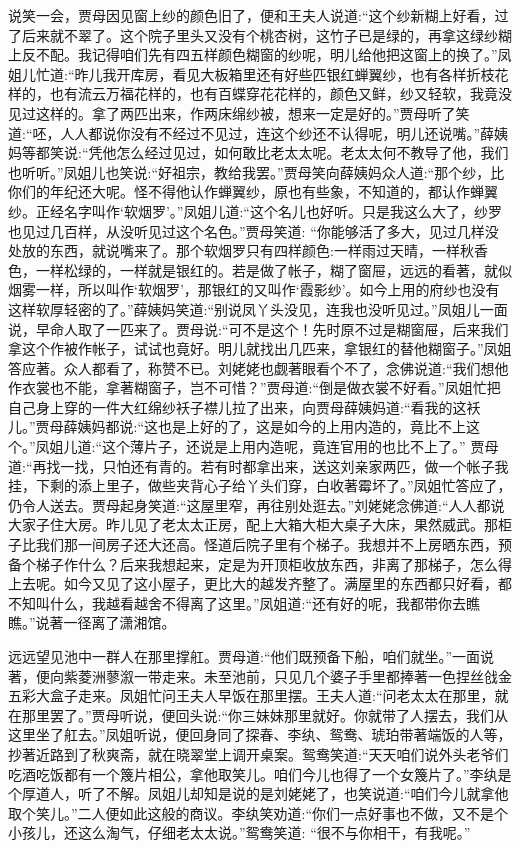 \begin{parag}
    说笑一会，贾母因见窗上纱的颜色旧了，便和王夫人说道:“这个纱新糊上好看，过了后来就不翠了。这个院子里头又没有个桃杏树，这竹子已是绿的，再拿这绿纱糊上反不配。我记得咱们先有四五样颜色糊窗的纱呢，明儿给他把这窗上的换了。”凤姐儿忙道:“昨儿我开库房，看见大板箱里还有好些匹银红蝉翼纱，也有各样折枝花样的，也有流云万福花样的，也有百蝶穿花花样的，颜色又鲜，纱又轻软，我竟没见过这样的。拿了两匹出来，作两床绵纱被，想来一定是好的。”贾母听了笑道:“呸，人人都说你没有不经过不见过，连这个纱还不认得呢，明儿还说嘴。”薛姨妈等都笑说:“凭他怎么经过见过，如何敢比老太太呢。老太太何不教导了他，我们也听听。”凤姐儿也笑说:“好祖宗，教给我罢。”贾母笑向薛姨妈众人道:“那个纱，比你们的年纪还大呢。怪不得他认作蝉翼纱，原也有些象，不知道的，都认作蝉翼纱。正经名字叫作‘软烟罗’。”凤姐儿道:“这个名儿也好听。只是我这么大了，纱罗也见过几百样，从没听见过这个名色。”贾母笑道: “你能够活了多大，见过几样没处放的东西，就说嘴来了。那个软烟罗只有四样颜色:一样雨过天晴，一样秋香色，一样松绿的，一样就是银红的。若是做了帐子，糊了窗屉，远远的看著，就似烟雾一样，所以叫作‘软烟罗’，那银红的又叫作‘霞影纱’。如今上用的府纱也没有这样软厚轻密的了。”薛姨妈笑道:“别说凤丫头没见，连我也没听见过。”凤姐儿一面说，早命人取了一匹来了。贾母说:“可不是这个！先时原不过是糊窗屉，后来我们拿这个作被作帐子，试试也竟好。明儿就找出几匹来，拿银红的替他糊窗子。”凤姐答应著。众人都看了，称赞不已。刘姥姥也觑著眼看个不了，念佛说道:“我们想他作衣裳也不能，拿著糊窗子，岂不可惜？”贾母道:“倒是做衣裳不好看。”凤姐忙把自己身上穿的一件大红绵纱袄子襟儿拉了出来，向贾母薛姨妈道:“看我的这袄儿。”贾母薛姨妈都说:“这也是上好的了，这是如今的上用内造的，竟比不上这个。”凤姐儿道:“这个薄片子，还说是上用内造呢，竟连官用的也比不上了。” 贾母道:“再找一找，只怕还有青的。若有时都拿出来，送这刘亲家两匹，做一个帐子我挂，下剩的添上里子，做些夹背心子给丫头们穿，白收著霉坏了。”凤姐忙答应了，仍令人送去。贾母起身笑道:“这屋里窄，再往别处逛去。”刘姥姥念佛道:“人人都说大家子住大房。昨儿见了老太太正房，配上大箱大柜大桌子大床，果然威武。那柜子比我们那一间房子还大还高。怪道后院子里有个梯子。我想并不上房晒东西，预备个梯子作什么？后来我想起来，定是为开顶柜收放东西，非离了那梯子，怎么得上去呢。如今又见了这小屋子，更比大的越发齐整了。满屋里的东西都只好看，都不知叫什么，我越看越舍不得离了这里。”凤姐道:“还有好的呢，我都带你去瞧瞧。”说著一径离了潇湘馆。
\end{parag}


\begin{parag}
    远远望见池中一群人在那里撑舡。贾母道:“他们既预备下船，咱们就坐。”一面说著，便向紫菱洲蓼溆一带走来。未至池前，只见几个婆子手里都捧著一色捏丝戗金五彩大盒子走来。凤姐忙问王夫人早饭在那里摆。王夫人道:“问老太太在那里，就在那里罢了。”贾母听说，便回头说:“你三妹妹那里就好。你就带了人摆去，我们从这里坐了舡去。”凤姐听说，便回身同了探春、李纨、鸳鸯、琥珀带著端饭的人等，抄著近路到了秋爽斋，就在晓翠堂上调开桌案。鸳鸯笑道:“天天咱们说外头老爷们吃酒吃饭都有一个篾片相公，拿他取笑儿。咱们今儿也得了一个女篾片了。”李纨是个厚道人，听了不解。凤姐儿却知是说的是刘姥姥了，也笑说道:“咱们今儿就拿他取个笑儿。”二人便如此这般的商议。李纨笑劝道:“你们一点好事也不做，又不是个小孩儿，还这么淘气，仔细老太太说。”鸳鸯笑道: “很不与你相干，有我呢。”
\end{parag}


